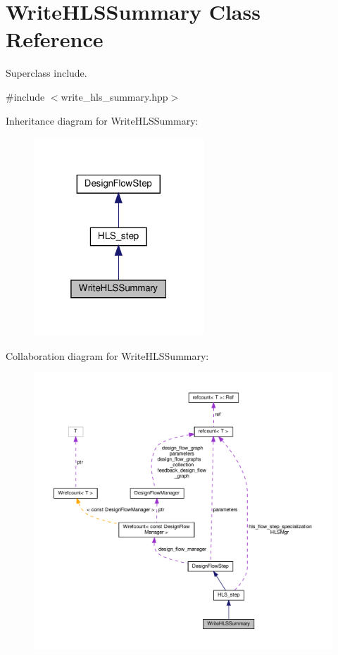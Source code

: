 \hypertarget{classWriteHLSSummary}{}\section{Write\+H\+L\+S\+Summary Class Reference}
\label{classWriteHLSSummary}


Superclass include.  




{\ttfamily \#include $<$write\+\_\+hls\+\_\+summary.\+hpp$>$}



Inheritance diagram for Write\+H\+L\+S\+Summary\+:
\nopagebreak
\begin{figure}[H]
\begin{center}
\leavevmode
\includegraphics[width=181pt]{d7/d8d/classWriteHLSSummary__inherit__graph}
\end{center}
\end{figure}


Collaboration diagram for Write\+H\+L\+S\+Summary\+:
\nopagebreak
\begin{figure}[H]
\begin{center}
\leavevmode
\includegraphics[width=350pt]{d6/dcd/classWriteHLSSummary__coll__graph}
\end{center}
\end{figure}
